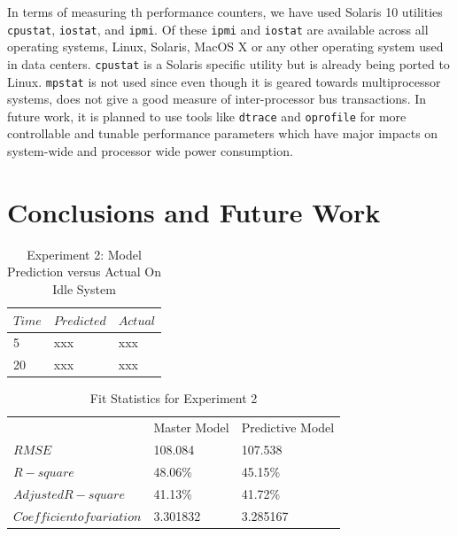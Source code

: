 \documentclass[times, 10pt,onecolumn]{article}
\begin{document}
In terms of measuring th performance counters, we have used Solaris 10
utilities \texttt{cpustat}, \texttt{iostat}, and \texttt{ipmi}. Of these
\texttt{ipmi} and \texttt{iostat} are available across all operating
systems, Linux, Solaris, MacOS X or any other operating system used in
data centers. \texttt{cpustat} is a Solaris specific utility but is
already being ported to Linux. \texttt{mpstat} is not used since even
though it is geared towards multiprocessor systems, does not give a good
measure of inter-processor bus transactions. In future work, it is
planned to use tools like \texttt{dtrace} and \texttt{oprofile} for more
controllable and tunable performance parameters which have major impacts
on system-wide and processor wide power consumption.

\section{Conclusions and Future Work}
\label{sec:conclusions}

\label{sec:references}
\nocite{*}





\begin{table}
  \centering
  \begin{tabular}{l|l||l}
    $Time$&$Predicted$&$Actual$\\
    \hline
    5 & xxx & xxx\\
    20& xxx & xxx\\
  \end{tabular}
  \caption{Experiment 2: Model Prediction versus Actual On Idle System}
  \label{tab:exp2design}
\end{table}

\begin{table}
  \centering
  \begin{tabular}{l|ll}
    &Master Model&Predictive Model \\
    $RMSE$&108.084&107.538\\
    $R-square$&48.06\%&45.15\% \\
    $Adjusted R-square$&41.13\%&41.72\% \\
    $Coefficient of variation$&3.301832&3.285167 \\
  \end{tabular}
  \caption{Fit Statistics for Experiment 2}
  \label{tab:exp2fit}
\end{table}
\end{document}
